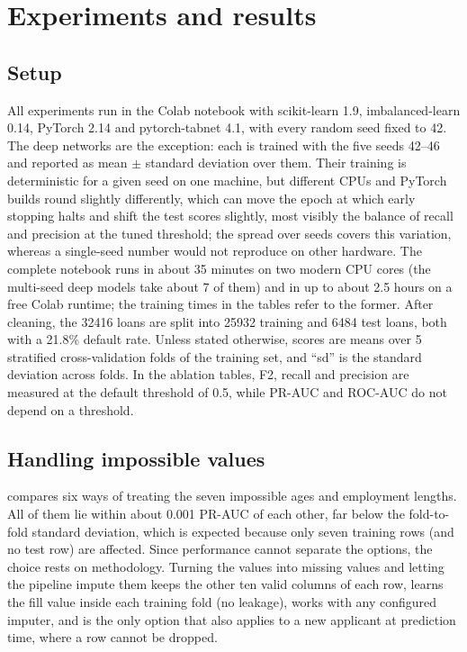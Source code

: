 \section{Experiments and results}
\label{sec:experiments}

\subsection{Setup}
All experiments run in the Colab notebook with scikit-learn 1.9, imbalanced-learn 0.14, PyTorch 2.14 and pytorch-tabnet 4.1, with every random seed fixed to 42.
The deep networks are the exception: each is trained with the five seeds 42--46 and reported as mean $\pm$ standard deviation over them.
Their training is deterministic for a given seed on one machine, but different CPUs and PyTorch builds round slightly differently, which can move the epoch at which early stopping halts and shift the test scores slightly, most visibly the balance of recall and precision at the tuned threshold; the spread over seeds covers this variation, whereas a single-seed number would not reproduce on other hardware.
The complete notebook runs in about 35 minutes on two modern CPU cores (the multi-seed deep models take about 7 of them) and in up to about 2.5 hours on a free Colab runtime; the training times in the tables refer to the former.
After cleaning, the \num{32416} loans are split into \num{25932} training and \num{6484} test loans, both with a 21.8\% default rate.
Unless stated otherwise, scores are means over 5 stratified cross-validation folds of the training set, and ``sd'' is the standard deviation across folds.
In the ablation tables, F2, recall and precision are measured at the default threshold of 0.5, while PR-AUC and ROC-AUC do not depend on a threshold.

\subsection{Handling impossible values}
\label{subsec:exp_impossible}
 compares six ways of treating the seven impossible ages and employment lengths.
All of them lie within about 0.001 PR-AUC of each other, far below the fold-to-fold standard deviation, which is expected because only seven training rows (and no test row) are affected.
Since performance cannot separate the options, the choice rests on methodology.
Turning the values into missing values and letting the pipeline impute them keeps the other ten valid columns of each row, learns the fill value inside each training fold (no leakage), works with any configured imputer, and is the only option that also applies to a new applicant at prediction time, where a row cannot be dropped.

